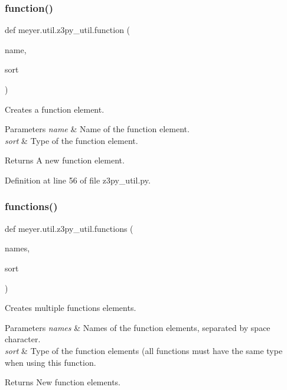 \subsubsection{\texorpdfstring{function()}{function()}}
{\footnotesize\ttfamily def meyer.\+util.\+z3py\+\_\+util.\+function (\begin{DoxyParamCaption}\item[{}]{name,  }\item[{}]{sort }\end{DoxyParamCaption})}



Creates a function element. 


\begin{DoxyParams}{Parameters}
{\em name} & Name of the function element. \\
\hline
{\em sort} & Type of the function element. \\
\hline
\end{DoxyParams}
\begin{DoxyReturn}{Returns}
A new function element. 
\end{DoxyReturn}


Definition at line 56 of file z3py\+\_\+util.\+py.

\mbox{\label{namespacemeyer_1_1util_1_1z3py__util_a6cf5a3dfdff69d332f989d1b8f73119b}} 
\subsubsection{\texorpdfstring{functions()}{functions()}}
{\footnotesize\ttfamily def meyer.\+util.\+z3py\+\_\+util.\+functions (\begin{DoxyParamCaption}\item[{}]{names,  }\item[{}]{sort }\end{DoxyParamCaption})}



Creates multiple functions elements. 


\begin{DoxyParams}{Parameters}
{\em names} & Names of the function elements, separated by space character. \\
\hline
{\em sort} & Type of the function elements (all functions must have the same type when using this function. \\
\hline
\end{DoxyParams}
\begin{DoxyReturn}{Returns}
New function elements. 
\end{DoxyReturn}


